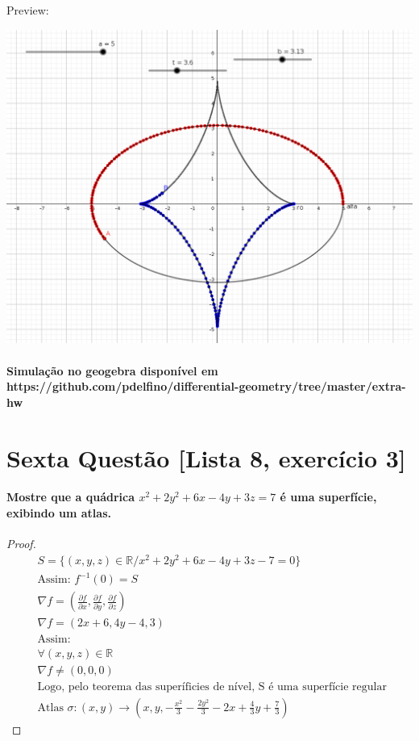 \documentclass[fleqn]{article}
\begin{document}
\newpage

Preview:
\bigskip

\includegraphics[scale=0.2]{evoluta}
\bigskip

\paragraph{Simulação no geogebra disponível em https://github.com/pdelfino/differential-geometry/tree/master/extra-hw}

\newpage

\section*{Sexta Questão [Lista 8, exercício 3]} 

\paragraph{Mostre que a quádrica $x^2 + 2y^2 + 6x - 4y+ 3z = 7$ é uma superfície, exibindo um atlas.}


\begin{proof}
\begin{align*}
 & S = \{(x,y,z)\in \mathbb{R} / x^2 + 2y^2 + 6x -   4y+ 3z -7 =0 \}\\
 & \text{Assim: } f^{-1}(0)=S  \\
 & \nabla f= (\frac{\partial f}{\partial x},    \frac{\partial f}{\partial y},\frac{\partial f}  {\partial z}) \\
&  \nabla f= (2x+6, 4y - 4, 3) \\
 & \text{Assim: } \\
 & \forall (x,y,z)\in \mathbb{R}  \\
 & \nabla f \neq (0,0,0)\\
 & \text{Logo, pelo teorema das superíficies de  nível, S é uma superfície regular } \\
 & \text{Atlas  } \sigma : (x,y) \rightarrow (x,y,-\frac{x^2}{3}   -\frac{2y^2}{3} -2x + \frac{4}{3}y +\frac{7}{3})
\end{align*}
\end{proof}
\end{document}
